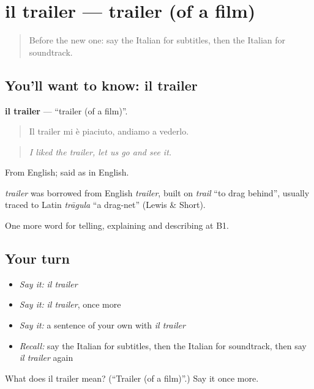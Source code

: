 \section[il trailer]{il trailer — trailer (of a film)}

\label{lesson:IT-C529-trailer}



\begin{quote}
Before the new one: say the Italian for subtitles, then the Italian for soundtrack.
\end{quote}

\subsection*{You'll want to know: il trailer}
\textbf{il trailer} — \textquotedblleft{}trailer (of a film)\textquotedblright{}.

\begin{quote}
Il trailer mi è piaciuto, andiamo a vederlo.
\end{quote}

\begin{quote}
\emph{I liked the trailer, let us go and see it.}
\end{quote}

From English; said as in English.

\begin{cousinweb}
\emph{trailer} was borrowed from English \emph{trailer}, built on \emph{trail} \textquotedblleft{}to drag behind\textquotedblright{}, usually traced to Latin \emph{trāgula} \textquotedblleft{}a drag-net\textquotedblright{} (Lewis \& Short).
\end{cousinweb}

\begin{grammarlens}[title={What you've built}]
One more word for telling, explaining and describing at B1.
\end{grammarlens}

\subsection*{Your turn}
\begin{itemize}
\raggedright
  \item \emph{Say it:} \emph{il trailer}
  \item \emph{Say it:} \emph{il trailer}, once more
  \item \emph{Say it:} a sentence of your own with \emph{il trailer}
  \item \emph{Recall:} say the Italian for subtitles, then the Italian for soundtrack, then say \emph{il trailer} again
\end{itemize}

\begin{tcolorbox}[breakable,colback=teal!4,colframe=teal!35!black,title={Before you move on}]
What does il trailer mean? (\textquotedblleft{}Trailer (of a film)\textquotedblright{}.) Say it once more.
\end{tcolorbox}
